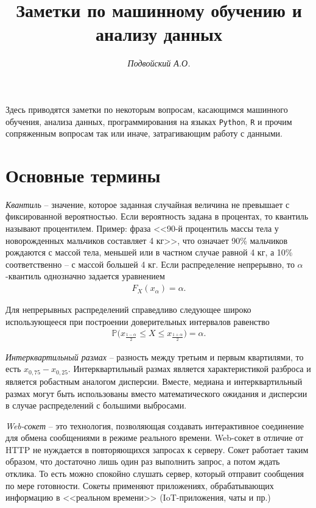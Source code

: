 \documentclass[%
	11pt,
	a4paper,
	utf8,
		]{article}
\begin{document}
\title{Заметки по машинному обучению и анализу данных}

\author{\itshape Подвойский А.О.}

\date{}
\maketitle

\thispagestyle{fancy}

Здесь приводятся заметки по некоторым вопросам, касающимся машинного обучения, анализа данных, программирования на языках \texttt{Python}, \texttt{R} и прочим сопряженным вопросам так или иначе, затрагивающим работу с данными.




\tableofcontents

\section{Основные термины}

\noindent\emph{Квантиль} -- значение, которое заданная случайная величина не превышает с фиксированной вероятностью. Если вероятность задана в процентах, то квантиль называют процентилем. Пример: фраза <<90-й процентиль массы тела у новорожденных мальчиков составляет 4 кг>>, что означает 90\% мальчиков рождаются с массой тела, меньшей или в частном случае равной 4 кг, а 10\% соответственно -- с массой большей 4 кг. Если распределение непрерывно, то $ \alpha $-квантиль однозначно задается уравнением
\begin{align*}
	F_X(x_\alpha) = \alpha.
\end{align*}

Для непрерывных распределений справедливо следующее широко использующееся при построении доверительных интервалов равенство
\begin{align*}
	\mathbb{P}\big(x_{\frac{1 - \alpha}{2}} \leqslant X \leqslant x_{\frac{1 + \alpha}{2}}\big) = \alpha.
\end{align*}

\noindent\emph{Интерквартильный размах} -- разность между третьим и первым квартилями, то есть $ x_{0,75} - x_{0,25} $. Интерквартильный размах является характеристикой разброса и является робастным аналогом дисперсии. Вместе, медиана и интерквартильный размах могут быть использованы вместо математического ожидания и дисперсии в случае распределений с большими выбросами.

\noindent\emph{Web-сокет} -- это технология, позволяющая создавать интерактивное соединение для обмена сообщениями в режиме реального времени. Web-сокет в отличие от HTTP не нуждается в повторяющихся запросах к серверу. Сокет работает таким образом, что достаточно лишь один раз выполнить запрос, а потом ждать отклика. То есть можно спокойно слушать сервер, который отправит сообщения по мере готовности. Сокеты применяют приложениях, обрабатывающих информацию в <<реальном времени>> (IoT-приложения, чаты и пр.)
\end{document}
